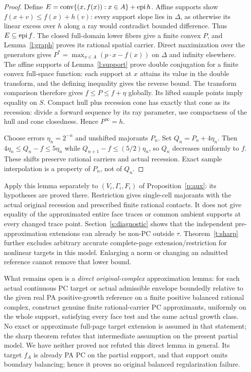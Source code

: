 \documentclass[11pt]{article}
\theoremstyle{definition}\newtheorem{definition}[theorem]{Definition}
\theoremstyle{remark}\newtheorem{remark}[theorem]{Remark}
\newcommand{\conv}{\operatorname{conv}}\newcommand{\cone}{\operatorname{cone}}
\begin{document}
\begin{proof}
Define $E=\conv\{(x,f(x)):x\in A\}+\epi h$. Affine supports show $f(x+v)\leq f(x)+h(v)$: every support slope lies in $\Delta$, as otherwise its linear excess over $h$ along a ray would contradict bounded difference. Thus $E\subseteq\operatorname{epi} f$. The closed full-domain lower fibers give a finite convex $P$, and Lemma~\ref{l:graph} proves its rational spatial carrier. Direct maximization over the generators gives $P^*\!=\max_{x\in A}(p\cdot x-f(x))$ on $\Delta$ and infinity elsewhere. The affine supports of Lemma~\ref{l:support} prove double conjugation for a finite convex full-space function: each support at $x$ attains its value in the double transform, and the defining inequality gives the reverse bound. The transform comparison therefore gives $f\leq P\leq f+\eta$ globally. Its lifted sample points imply equality on $S$. Compact hull plus recession cone has exactly that cone as its recession: divide a forward sequence by its ray parameter, use compactness of the hull and cone closedness. Hence $P^\infty=h$.

Choose errors $\eta_n=2^{-n}$ and unshifted majorants $P_n$. Set $Q_n=P_n+4\eta_n$. Then $4\eta_n\leq Q_n-f\leq5\eta_n$ while $Q_{n+1}-f\leq(5/2)\eta_n$, so $Q_n$ decreases uniformly to $f$. These shifts preserve rational carriers and actual recession. Exact sample interpolation is a property of $P_n$, not of $Q_n$.
\end{proof}

Apply this lemma separately to $(V_i,\Gamma_i,F_i)$ of Proposition~\ref{p:aux}: its hypotheses are proved there. Restriction gives single-cell majorants with the actual original recession and prescribed finite rational contacts. It does not give equality of the approximated entire face traces or common ambient supports at every changed trace point. Section~\ref{s:diagnostic} shows that the independent pre-approximation extensions can already be non-PC outside $\tau$. Theorem~\ref{t:sharp} further excludes arbitrary accurate complete-page extension/restriction for nonlinear targets in this model. Enlarging a norm or changing an admitted reference cannot remove that lower bound.

What remains open is a \emph{direct original-complex} approximation lemma: for each actual continuous PC target or actual admissible envelope boundedly relative to the given real PA positive-growth reference on a finite positive balanced rational complex, construct genuine finite rational-carrier PC approximants, uniformly on the whole support, satisfying every face test and the same actual growth class. No exact or approximate full-page target extension is assumed in that statement; the sharp theorem refutes that intermediate assumption on the present partial model. We have neither proved nor refuted this direct lemma in general. Its target $f_A$ is already PA PC on the partial support, and that support omits boundary balancing; hence it proves no original balanced regularization failure.
\end{document}
